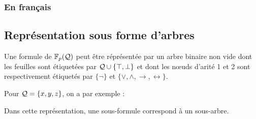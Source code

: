 		\subsubsection{En français}
		
		
	\subsection{Représentation sous forme d'arbres}
	
		Une formule de \(\bb{F}_p(\cal{Q})\) peut être réprésentée par un arbre binaire non vide dont les feuilles sont étiquetées par \(\cal{Q} \cup \{\top,\bot\}\) et dont les n\oe uds d'arité 1 et 2 sont respectivement étiquetés par \(\{\neg\}\) et \(\{\vee,\wedge,\rightarrow,\leftrightarrow\}\). 
		
		\begin{Exemple}
			Pour \(\cal{Q} = \{x,y,z\}\), on a par exemple :
		\end{Exemple}
		
		\begin{Remarque}
			Dans cette représentation, une sous-formule correspond à un sous-arbre.
		\end{Remarque}
		
